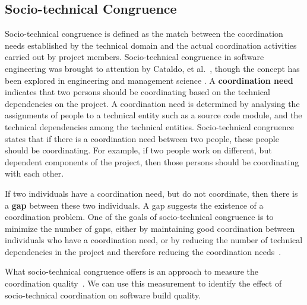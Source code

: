\subsection{Socio-technical Congruence}
Socio-technical congruence is defined as the match between the coordination needs established by the technical domain and the actual coordination activities carried out by project members. Socio-technical congruence in software engineering was brought to attention by Cataldo, et al.~\cite{cataldo:cscw:2006}, though the concept has been explored in engineering \cite{browning2001} and management science \cite{henderson1990}. A \textbf{coordination need} indicates that two persons should be coordinating based on the technical dependencies on the project. A coordination need is determined by analysing the assignments of people to a technical entity such as a source code module, and the technical dependencies among the technical entities.
Socio-technical congruence states that if there is a coordination need between two people, these people should be coordinating.
For example, if two people work on different, but dependent components of the project, then those persons should be coordinating with each other.

If two individuals have a coordination need, but do not coordinate, then there is a \textbf{gap} between these two individuals. A gap suggests the existence of a coordination problem. One of the goals of socio-technical congruence is to minimize the number of gaps, either by maintaining good coordination between individuals who have a coordination need, or by reducing the number of technical dependencies in the project and therefore reducing the coordination needs~\cite{sarma2008:measuring_stc}.

What socio-technical congruence offers is an approach to measure the coordination quality~\cite{cataldo:cscw:2006}. We can use this measurement to identify the effect of socio-technical coordination on software build quality.


%
%

